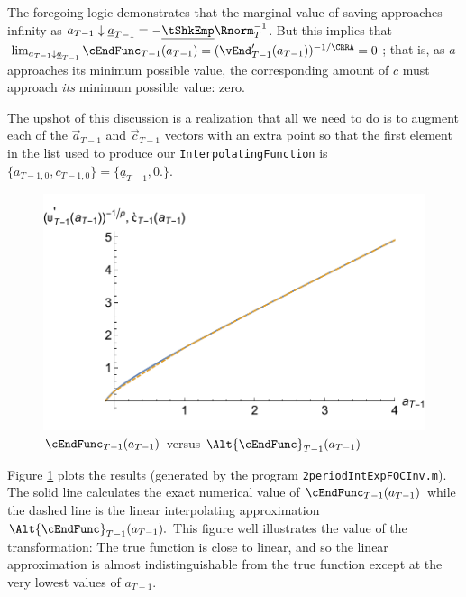 \documentclass[titlepage]{\econtex}
\begin{document}
The foregoing logic demonstrates that the marginal value of saving approaches infinity as ${a}_{T-1} \downarrow
\underline{a}_{T-1}=-\underline{\tShkEmp}\Rnorm_{T}^{-1}$.  But this
implies that $\lim_{{a}_{T-1} \downarrow \underline{a}_{T-1}}
\cEndFunc_{T-1}({a}_{T-1}) = (\vEnd_{T-1}^{\prime}({a}_{T-1}))^{-1/\CRRA} = 0$;
that is, as ${a}$ approaches its minimum possible value, the
corresponding amount of ${c}$ must approach \textit{its} minimum possible value: zero.

The upshot of this discussion is a realization that all we need to do is to
augment each of the $\vec{a}_{T-1}$ and $\vec{c}_{T-1}$ vectors with an extra point so that the
first element in the list used to produce our \texttt{InterpolatingFunction} is
$\{{a}_{T-1,0},{c}_{T-1,0}\}=\{\underline{a}_{T-1},0.\}$.

\hypertarget{GothVInvVSGothC}{}
\begin{figure}
  \includegraphics{./Figures/GothVInvVSGothC}
  \caption{$\cEndFunc_{T-1}({a}_{T-1})$ versus $\Alt{\cEndFunc}_{T-1}({a}_{T-1})$}
  \label{fig:GothVInvVSGothC}
\end{figure}



Figure
\ref{fig:GothVInvVSGothC} plots the results (generated by the program
\texttt{2periodIntExpFOCInv.m}).
The solid line calculates the exact
numerical value of $\cEndFunc_{T-1}({a}_{T-1})$ while the dashed
line is the linear interpolating approximation
$\Alt{\cEndFunc}_{T-1}({a}_{T-1}).$ This figure well illustrates the
value of the transformation: The
true function is close to linear,
and so the linear approximation is almost indistinguishable from the
true function except at the very lowest values of ${a}_{T-1}$.
\end{document}
